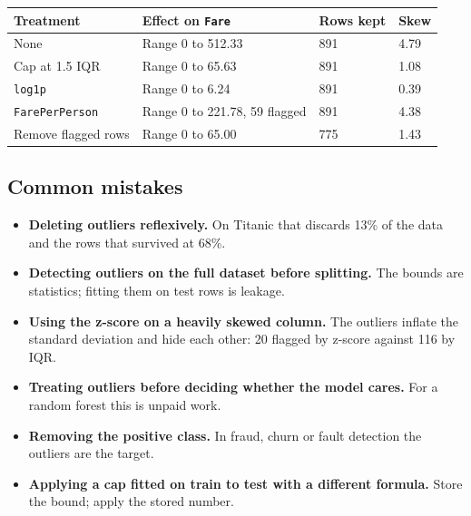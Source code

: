 \documentclass[11pt,a4paper]{article}
\begin{document}
\begin{tabularx}{\textwidth}{@{}l X l l@{}}
\toprule
\rowcolor{tablehead} \textbf{Treatment} & \textbf{Effect on \texttt{Fare}} & \textbf{Rows kept} & \textbf{Skew} \\
\midrule
None & Range 0 to 512.33 & 891 & 4.79 \\
Cap at 1.5 IQR & Range 0 to 65.63 & 891 & 1.08 \\
\lstinline|log1p| & Range 0 to 6.24 & 891 & 0.39 \\
\texttt{FarePerPerson} & Range 0 to 221.78, 59 flagged & 891 & 4.38 \\
Remove flagged rows & Range 0 to 65.00 & 775 & 1.43 \\
\bottomrule
\end{tabularx}


\subsection*{Common mistakes}

\begin{itemize}\itemsep3pt
  \item \textbf{Deleting outliers reflexively.} On Titanic that discards 13\% of the data
        and the rows that survived at 68\%.
  \item \textbf{Detecting outliers on the full dataset before splitting.} The bounds are
        statistics; fitting them on test rows is leakage.
  \item \textbf{Using the z-score on a heavily skewed column.} The outliers inflate the
        standard deviation and hide each other: 20 flagged by z-score against 116 by IQR.
  \item \textbf{Treating outliers before deciding whether the model cares.} For a random
        forest this is unpaid work.
  \item \textbf{Removing the positive class.} In fraud, churn or fault detection the
        outliers are the target.
  \item \textbf{Applying a cap fitted on train to test with a different formula.} Store the
        bound; apply the stored number.
\end{itemize}
\end{document}
